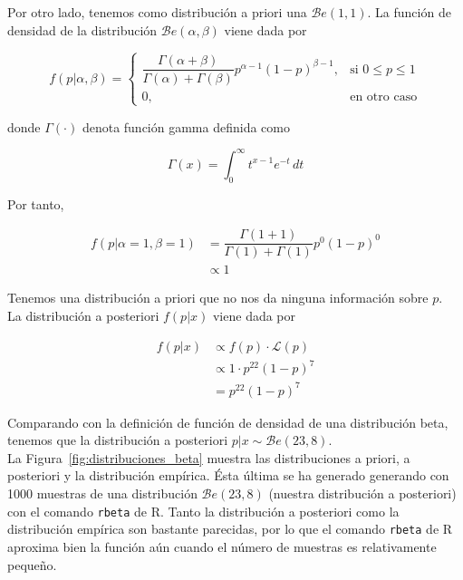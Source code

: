 \documentclass[12pt,a4paper,twoside,openright,titlepage,final]{article}
\begin{document}
Por otro lado, tenemos como distribución a priori una $\mathcal{B}e(1,1)$. La función de densidad de la distribución $\mathcal{B}e(\alpha, \beta)$ viene dada por

\begin{equation*}
f(p|\alpha, \beta) = \begin{cases}
\dfrac{\Gamma(\alpha + \beta)}{\Gamma(\alpha) + \Gamma(\beta)}p^{\alpha - 1}(1-p)^{\beta - 1}, & \text{si } 0 \leq p \leq 1\\
0, & \text{en otro caso} 
\end{cases}
\end{equation*} 

donde $\Gamma(\cdot)$ denota función gamma definida como

\begin{equation*}
\Gamma(x) = \int_{0}^{\infty} t^{x-1}e^{-t} \, dt
\end{equation*}

Por tanto,

\begin{align*}
f(p | \alpha = 1, \beta = 1) & = \dfrac{\Gamma(1 + 1)}{\Gamma(1) + \Gamma(1)}p^{0}(1-p)^{0} \\ & \propto 1 
\end{align*}

Tenemos una distribución a priori que no nos da ninguna información sobre $p$.\\

La distribución a posteriori $f(p|x)$ viene dada por

\begin{align*}
f(p|x) & \propto f(p) \cdot \mathcal{L}(p) \\ & \propto 1 \cdot p^{22}(1-p)^{7} \\ & = p^{22}(1-p)^{7}
\end{align*}

Comparando con la definición de función de densidad de una distribución beta, tenemos que la distribución a posteriori $p|x \sim \mathcal{B}e(23,8)$.\\

La Figura~\ref{fig:distribuciones_beta} muestra las distribuciones a priori, a posteriori y la distribución empírica. Ésta última se ha generado generando con 1000 muestras de una distribución $\mathcal{B}e(23,8)$ (nuestra distribución a posteriori) con el comando \texttt{rbeta} de R. Tanto la distribución a posteriori como la distribución empírica son bastante parecidas, por lo que el comando \texttt{rbeta} de R aproxima bien la función aún cuando el número de muestras es relativamente pequeño.\\
\end{document}
